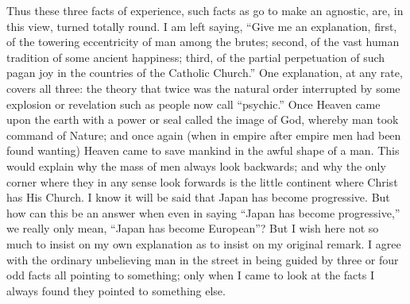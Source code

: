 Thus these three facts of experience, such facts as go to make an agnostic, are, in this view, turned totally round. I am left saying, “Give me an explanation, first, of the towering eccentricity of man among the brutes; second, of the vast human tradition of some ancient happiness; third, of the partial perpetuation of such pagan joy in the countries of the Catholic Church.” One explanation, at any rate, covers all three: the theory that twice was the natural order interrupted by some explosion or revelation such as people now call “psychic.” Once Heaven came upon the earth with a power or seal called the image of God, whereby man took command of Nature; and once again (when in empire after empire men had been found wanting) Heaven came to save mankind in the awful shape of a man. This would explain why the mass of men always look backwards; and why the only corner where they in any sense look forwards is the little continent where Christ has His Church. I know it will be said that Japan has become progressive. But how can this be an answer when even in saying “Japan has become progressive,” we really only mean, “Japan has become European”? But I wish here not so much to insist on my own explanation as to insist on my original remark. I agree with the ordinary unbelieving man in the street in being guided by three or four odd facts all pointing to something; only when I came to look at the facts I always found they pointed to something else.

